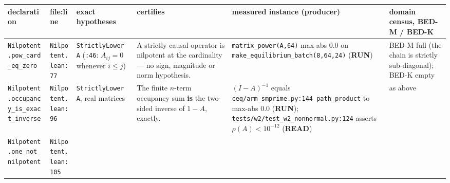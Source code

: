 \documentclass[11pt,a4paper]{article}
\newcounter{none}                 %
\theoremstyle{plain}
\theoremstyle{definition}
\theoremstyle{remark}
\begin{document}
{\def\LTcaptype{none} %
\begin{longtable}[]{@{}
  >{\raggedright\arraybackslash}p{}
  >{\raggedright\arraybackslash}p{}
  >{\raggedright\arraybackslash}p{}
  >{\raggedright\arraybackslash}p{}
  >{\raggedright\arraybackslash}p{}
  >{\raggedright\arraybackslash}p{}@{}}
\toprule\noalign{}
\begin{minipage}[b]{\linewidth}\raggedright
declaration
\end{minipage} & \begin{minipage}[b]{\linewidth}\raggedright
file:line
\end{minipage} & \begin{minipage}[b]{\linewidth}\raggedright
exact hypotheses
\end{minipage} & \begin{minipage}[b]{\linewidth}\raggedright
certifies
\end{minipage} & \begin{minipage}[b]{\linewidth}\raggedright
measured instance (producer)
\end{minipage} & \begin{minipage}[b]{\linewidth}\raggedright
domain census, BED-M / BED-K
\end{minipage} \\
\midrule\noalign{}
\endhead
\bottomrule\noalign{}
\endlastfoot
\texttt{Nilpotent.pow\_card\_eq\_zero} & \texttt{Nilpotent.lean:77} &
\texttt{StrictlyLower\ A} (\texttt{:46}: \(A_{ij}=0\) whenever
\(i\le j\)) & A strictly causal operator is nilpotent at the cardinality
--- no sign, magnitude or norm hypothesis. &
\texttt{matrix\_power(A,64)} max-abs \(0.0\) on
\texttt{make\_equilibrium\_batch(8,64,24)} (\textbf{RUN}) & BED-M full
(the chain is strictly sub-diagonal); BED-K empty \\
\texttt{Nilpotent.occupancy\_is\_exact\_inverse} &
\texttt{Nilpotent.lean:96} & \texttt{StrictlyLower\ A}, real matrices &
The finite \(n\)-term occupancy sum \textbf{is} the two-sided inverse of
\(1-A\), exactly. & \((I-A)^{-1}\) equals
\texttt{ceq/arm\_smprime.py:144\ path\_product} to max-abs \(0.0\)
(\textbf{RUN}); \texttt{tests/w2/test\_w2\_nonnormal.py:124} asserts
\(\rho(A)<10^{-12}\) (\textbf{READ}) & as above \\
\texttt{Nilpotent.one\_not\_nilpotent} & \texttt{Nilpotent.lean:105} &

\end{longtable}}
\end{document}
